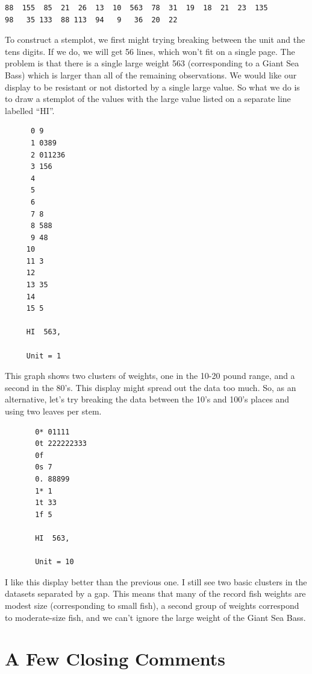 \documentclass[
]{book}
\begin{document}
\begin{verbatim}
88  155  85  21  26  13  10  563  78  31  19  18  21  23  135     
98   35 133  88 113  94   9   36  20  22
\end{verbatim}

To construct a stemplot, we first might trying breaking between the unit and the tens digits. If we do, we will get 56 lines, which won't fit on a single page. The problem is that there is a single large weight 563 (corresponding to a Giant Sea Bass) which is larger than all of the remaining observations. We would like our display to be resistant or not distorted by a single large value. So what we do is to draw a stemplot of the values with the large value listed on a separate line labelled ``HI''.

\begin{verbatim}
      0 9
      1 0389
      2 011236
      3 156
      4 
      5 
      6 
      7 8
      8 588
      9 48
     10 
     11 3
     12 
     13 35
     14 
     15 5

     HI  563,

     Unit = 1 
\end{verbatim}

This graph shows two clusters of weights, one in the 10-20 pound range, and a second in the 80's. This display might spread out the data too much. So, as an alternative, let's try breaking the data between the 10's and 100's places and using two leaves per stem.

\begin{verbatim}
       0* 01111
       0t 222222333
       0f 
       0s 7
       0. 88899
       1* 1
       1t 33
       1f 5

       HI  563,

       Unit = 10 
\end{verbatim}

I like this display better than the previous one. I still see two basic clusters in the datasets separated by a gap. This means that many of the record fish weights are modest size (corresponding to small fish), a second group of weights correspond to moderate-size fish, and we can't ignore the large weight of the Giant Sea Bass.

\hypertarget{a-few-closing-comments}{%
\section{A Few Closing Comments}\label{a-few-closing-comments}}
\end{document}
